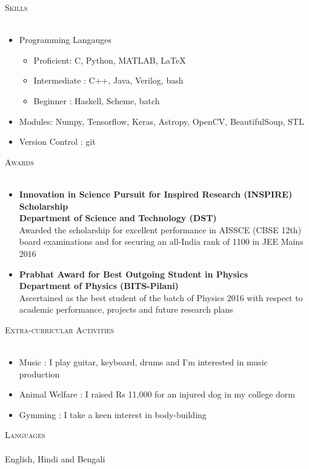 \documentclass[a4paper]{article}
\newcommand{\lineunder} {
    \vspace*{-8pt} \\
    \hspace*{-18pt} \hrulefill \\
}
\newcommand{\header} [1] {
    {\hspace*{-18pt}\vspace*{6pt} \textsc{#1}}
    \vspace*{-6pt} \lineunder
}
\begin{document}
\newpage

\header{Skills}
\begin{itemize}
	\item Programming Langauges
	\begin{itemize}
	    \item Proficient: C, Python, MATLAB, \LaTeX
	    \item Intermediate : C++, Java, Verilog, bash
	    \item Beginner : Haskell, Scheme, batch
	\end{itemize}
	\item Modules: Numpy, Tensorflow, Keras, Astropy, OpenCV, BeautifulSoup, STL
	\item Version Control : git
\end{itemize}
\vspace{2mm}

\header{Awards}
\begin{itemize}
    \item \textbf{Innovation in Science Pursuit for Inspired Research (INSPIRE) Scholarship} \\ \textbf{Department of Science and Technology (DST)}\\ \vspace{2mm}
Awarded the scholarship for excellent performance in AISSCE (CBSE 12th) board examinations and for securing an all-India rank of 1100 in JEE Mains 2016\\

    \item \textbf{Prabhat Award for Best Outgoing Student in Physics}  \\ \textbf{Department of Physics (BITS-Pilani)}\\ \vspace{2mm}
Ascertained as the best student of the batch of Physics 2016 with respect to academic performance, projects and future research plans
\end{itemize}


\header{Extra-curricular Activities}
\begin{itemize}
    \item Music : I play guitar, keyboard, drums and I'm interested in music production
    \item Animal Welfare : I raised Rs 11,000 for an injured dog in my college dorm
    \item Gymming : I take a keen interest in body-building
\end{itemize}
\vspace*{2mm}

\header{Languages}
English, Hindi and Bengali
\vspace*{2mm}

\ 
\end{document}
